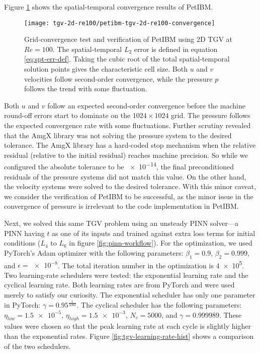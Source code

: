 Figure \ref{fig:tgv-petibm-convergence} shows the spatial-temporal convergence results of PetIBM.
\begin{figure}
    \centering%
    \texttt{[image: tgv-2d-re100/petibm-tgv-2d-re100-convergence]}%
    \caption{%
        Grid-convergence test and verification of PetIBM using 2D TGV at $Re=\num{100}$.
        The spatial-temporal $L_2$ error is defined in equation \eqref{eq:spt-err-def}.
        Taking the cubic root of the total spatial-temporal solution points gives the characteristic cell size.
        Both $u$ and $v$ velocities follow second-order convergence, while the pressure $p$ follows the trend with some fluctuation.
    }
    \label{fig:tgv-petibm-convergence}%
\end{figure}
Both $u$ and $v$ follow an expected second-order convergence before the machine round-off errors start to dominate on the $1024 \times 1024$ grid.
The pressure follows the expected convergence rate with some fluctuations.
Further scrutiny revealed that the AmgX library was not solving the pressure system to the desired tolerance.
The AmgX library has a hard-coded stop mechanism when the relative residual (relative to the initial residual) reaches machine precision.
So while we configured the absolute tolerance to be \num{e-14}, the final preconditioned residuals of the pressure systems did not match this value.
On the other hand, the velocity systems were solved to the desired tolerance.
With this minor caveat, we consider the verification of PetIBM to be successful, as the minor issue in the convergence of pressure is irrelevant to the code implementation in PetIBM.

Next, we solved this same TGV problem using an unsteady PINN solver---a PINN having $t$ as one of its inputs and trained against extra loss terms for initial conditions ($L_4$ to $L_6$ in figure \ref{fig:pinn-workflow}).
For the optimization, we used PyTorch's Adam optimizer
with the following parameters: $\beta_1=\num{0.9}$, $\beta_2=\num{0.999}$, and $\epsilon=\num{e-8}$.
The total iteration number in the optimization is \num{4e5}.
Two learning-rate schedulers were tested: the exponential learning rate and the cyclical learning rate.
Both learning rates are from PyTorch and were used merely to satisfy our curiosity.
The exponential scheduler has only one parameter in PyTorch: $\gamma=0.95^{\frac{1}{5000}}$.
The cyclical scheduler has the following parameters: $\eta_{low}=\num{1.5e-5}$, $\eta_{high}=\num{1.5e-3}$, $N_c=\num{5000}$, and $\gamma=0.999989$.
These values were chosen so that the peak learning rate at each cycle is slightly higher than the exponential rates.
Figure \ref{fig:tgv-learning-rate-hist} shows a comparison of the two schedulers.

